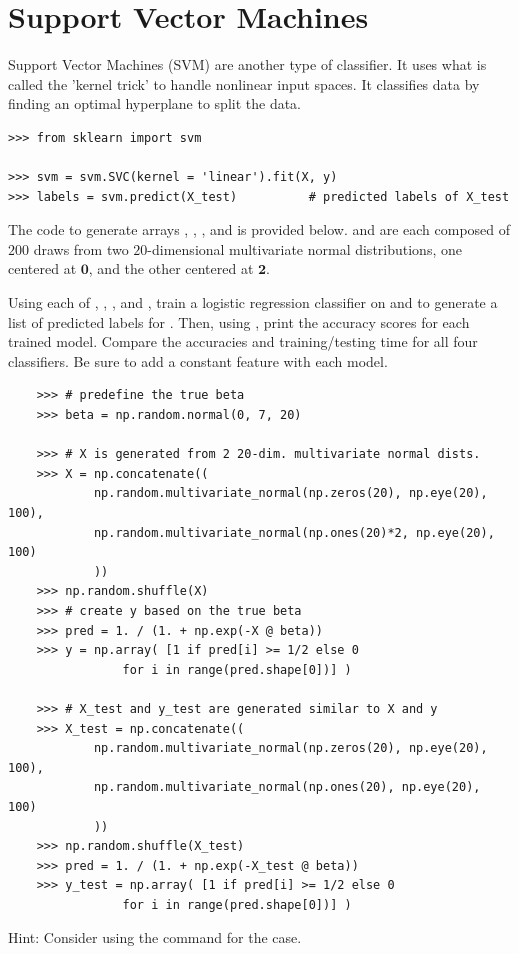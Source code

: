\section*{Support Vector Machines}

Support Vector Machines (SVM) are another type of classifier. It uses what is called the 'kernel trick' to handle nonlinear input spaces. It classifies data by finding an optimal hyperplane to split the data. 
\begin{lstlisting}
>>> from sklearn import svm

>>> svm = svm.SVC(kernel = 'linear').fit(X, y)
>>> labels = svm.predict(X_test)          # predicted labels of X_test
\end{lstlisting}


\begin{problem}
    The code to generate arrays , , , and  is provided below.
     and  are each composed of $200$ draws from two $20$-dimensional multivariate normal distributions, one centered at $\boldsymbol{0}$, and the other centered at $\boldsymbol{2}$.
    
    Using each of , , , and , train a logistic regression classifier on  and  to generate a list of predicted labels for .
    Then, using , print the accuracy scores for each trained model.
    Compare the accuracies and training/testing time for all four classifiers.
    Be sure to add a constant feature with each model.

    \begin{lstlisting}
    >>> # predefine the true beta
    >>> beta = np.random.normal(0, 7, 20)
        
    >>> # X is generated from 2 20-dim. multivariate normal dists.
    >>> X = np.concatenate(( 
            np.random.multivariate_normal(np.zeros(20), np.eye(20), 100), 
            np.random.multivariate_normal(np.ones(20)*2, np.eye(20), 100) 
            ))
    >>> np.random.shuffle(X)
    >>> # create y based on the true beta
    >>> pred = 1. / (1. + np.exp(-X @ beta))  
    >>> y = np.array( [1 if pred[i] >= 1/2 else 0 
                for i in range(pred.shape[0])] )
        
    >>> # X_test and y_test are generated similar to X and y
    >>> X_test = np.concatenate(( 
            np.random.multivariate_normal(np.zeros(20), np.eye(20), 100), 
            np.random.multivariate_normal(np.ones(20), np.eye(20), 100) 
            ))
    >>> np.random.shuffle(X_test)
    >>> pred = 1. / (1. + np.exp(-X_test @ beta))
    >>> y_test = np.array( [1 if pred[i] >= 1/2 else 0 
                for i in range(pred.shape[0])] )
    \end{lstlisting}
    Hint: Consider using the command  for the  case.
\end{problem}



